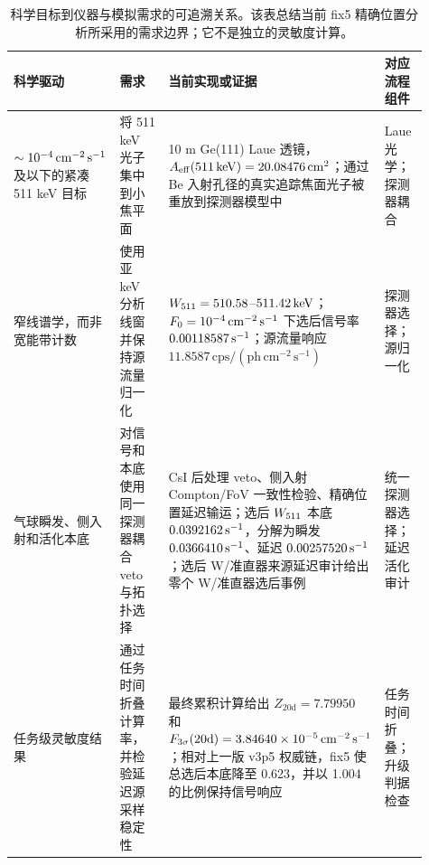 \begin{table}[t]
\centering
\caption{科学目标到仪器与模拟需求的可追溯关系。该表总结当前 fix5 精确位置分析所采用的需求边界；它不是独立的灵敏度计算。}
\label{tab:requirements_traceability}
\footnotesize
\begin{tabular}{@{}p{0.20\linewidth}p{0.22\linewidth}p{0.35\linewidth}p{0.14\linewidth}@{}}
\toprule
科学驱动 & 需求 & 当前实现或证据 & 对应流程组件 \\
\midrule
$\sim10^{-4}\,\mathrm{cm^{-2}\,s^{-1}}$ 及以下的紧凑 511 keV 目标 & 将 511 keV 光子集中到小焦平面 & 10 m Ge(111) Laue 透镜，$A_{\mathrm{eff}}(511\,\mathrm{keV})=20.08476\,\mathrm{cm^2}$；通过 Be 入射孔径的真实追踪焦面光子被重放到探测器模型中 & Laue 光学；探测器耦合 \\
窄线谱学，而非宽能带计数 & 使用亚 keV 分析线窗并保持源流量归一化 & $W_{511}=510.58$--$511.42\,\mathrm{keV}$；$F_{0}=10^{-4}\,\mathrm{cm^{-2}\,s^{-1}}$ 下选后信号率 $0.00118587\,\mathrm{s^{-1}}$；源流量响应 $11.8587\,\mathrm{cps}/(\mathrm{ph\,cm^{-2}\,s^{-1}})$ & 探测器选择；源归一化 \\
气球瞬发、侧入射和活化本底 & 对信号和本底使用同一探测器耦合 veto 与拓扑选择 & CsI 后处理 veto、侧入射 Compton/FoV 一致性检验、精确位置延迟输运；选后 $W_{511}$ 本底 $0.0392162\,\mathrm{s^{-1}}$，分解为瞬发 $0.0366410\,\mathrm{s^{-1}}$、延迟 $0.00257520\,\mathrm{s^{-1}}$；选后 W/准直器来源延迟审计给出零个 W/准直器选后事例 & 统一探测器选择；延迟活化审计 \\
任务级灵敏度结果 & 通过任务时间折叠计算率，并检验延迟源采样稳定性 & 最终累积计算给出 $Z_{20\mathrm{d}}=7.79950$ 和 $F_{3\sigma}(20\mathrm{d})=3.84640\times10^{-5}\,\mathrm{cm^{-2}\,s^{-1}}$；相对上一版 v3p5 权威链，fix5 使总选后本底降至 0.623，并以 1.004 的比例保持信号响应 & 任务时间折叠；升级判据检查 \\
\bottomrule
\end{tabular}
\end{table}
